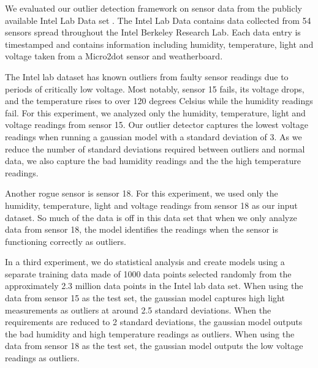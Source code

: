 
We evaluated our outlier detection framework on sensor data from the publicly available Intel Lab Data set \cite{IntelLabData}.
The Intel Lab Data contains data collected from 54 sensors spread throughout the Intel Berkeley Research Lab.
Each data entry is timestamped and contains information including humidity, temperature, light and voltage taken from a Micro2dot sensor and weatherboard.

The Intel lab dataset has known outliers from faulty sensor readings due to periods of critically low voltage.
Most notably, sensor 15 fails, its voltage drops, and the temperature rises to over 120 degrees Celsius while the humidity readings fail. 
For this experiment, we analyzed only the humidity, temperature, light and voltage readings from sensor 15.  
Our outlier detector captures the lowest voltage readings when running a gaussian model with a standard deviation of 3.
As we reduce the number of standard deviations required between outliers and normal data, we also capture the bad humidity readings and the the high temperature readings.

Another rogue sensor is sensor 18.
For this experiment, we used only the humidity, temperature, light and voltage readings from sensor 18 as our input dataset.
So much of the data is off in this data set that when we only analyze data from sensor 18, the model identifies the readings when the sensor is functioning correctly as outliers.

In a third experiment, we do statistical analysis and create models using a separate training data made of 1000 data points selected randomly from the approximately 2.3 million data points in the Intel lab data set.
When using the data from sensor 15 as the test set, the gaussian model captures high light measurements as outliers at around 2.5 standard deviations.
When the requirements are reduced to 2 standard deviations, the gaussian model outputs the bad humidity and high temperature readings as outliers.
When using the data from sensor 18 as the test set, the gaussian model outputs the low voltage readings as outliers.

